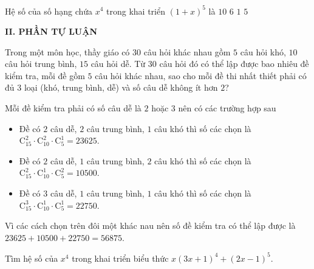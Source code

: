 \begin{ex}%
	Hệ số của số hạng chứa $x^4$ trong khai triển $(1+x)^5$ là
	\choice
	{$10$}
	{$6$}
	{$1$}
	{\True $5$}
\end{ex}


\noindent\textbf{II. PHẦN TỰ LUẬN}
\begin{bt}%
	Trong một môn học, thầy giáo có $30$ câu hỏi khác nhau gồm $5$ câu hỏi khó, $10$ câu hỏi trung bình, $15$ câu hỏi dễ. Từ $30$ câu hỏi đó có thể lập được bao nhiêu đề kiểm tra, mỗi đề gồm $5$ câu hỏi khác nhau, sao cho mỗi đề thi nhất thiết phải có đủ $3$ loại (khó, trung bình, dễ) và số câu dễ không ít hơn $2$?
	\loigiai
	{
		Mỗi đề kiểm tra phải có số câu dễ là $2$ hoặc $3$ nên có các trường hợp sau
		\begin{itemize}
			\item Đề có $2$ câu dễ, $2$ câu trung bình, $1$ câu khó thì số các chọn là $\mathrm{C}_{15}^2\cdot\mathrm{C}_{10}^2\cdot\mathrm{C}_5^1=23625$.
			\item Đề có $2$ câu dễ, $1$ câu trung bình, $2$ câu khó thì số các chọn là $\mathrm{C}_{15}^2\cdot\mathrm{C}_{10}^1\cdot\mathrm{C}_5^2=10500$.
			\item Đề có $3$ câu dễ, $1$ câu trung bình, $1$ câu khó thì số các chọn là $\mathrm{C}_{15}^3\cdot\mathrm{C}_{10}^1\cdot\mathrm{C}_5^1=22750$.
		\end{itemize}
		Vì các cách chọn trên đôi một khác nau nên số đề kiểm tra có thể lập được là
		$23625+10500+22750=56875$. 
	}
\end{bt}

\begin{bt}%
	Tìm hệ số của $x^4$ trong khai triển biểu thức $x(3x + 1)^4+(2x - 1)^5$.
\end{bt}

